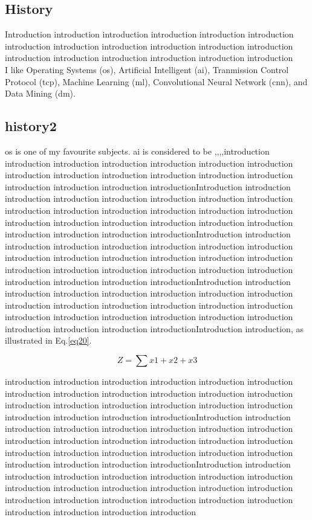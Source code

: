 \subsection{History}
Introduction introduction introduction introduction introduction introduction introduction introduction introduction introduction introduction introduction introduction introduction introduction introduction introduction introduction\\ 
I like Operating Systems (\ac{os}), Artificial Intelligent (\ac{ai}), Tranmission Control Protocol (\ac{tcp}), Machine Learning (\ac{ml}), Convolutional Neural Network (\ac{cnn}), and Data Mining (\ac{dm}). 




\subsection{history2}
\ac{os} is one of my favourite subjects.
\ac{ai} is considered to be ,,,,introduction introduction introduction introduction introduction introduction introduction introduction introduction introduction introduction introduction introduction introduction introduction introduction introductionIntroduction introduction introduction introduction introduction introduction introduction introduction introduction introduction introduction introduction introduction introduction introduction introduction introduction introduction introduction introduction introduction introduction introduction introductionIntroduction introduction introduction introduction introduction introduction introduction introduction introduction introduction introduction introduction introduction introduction introduction introduction introduction introduction introduction introduction introduction introduction introduction introductionIntroduction introduction introduction introduction introduction introduction introduction introduction introduction introduction introduction introduction introduction introduction introduction introduction introduction introduction introduction introduction introduction introduction introduction introductionIntroduction introduction, as illustrated in Eq.\ref{eq20}.

\begin{equation}
Z=\sum x1+x2+x3
\label{eq20}
\end{equation}

introduction introduction introduction introduction introduction introduction introduction introduction introduction introduction introduction introduction introduction introduction introduction introduction introduction introduction introduction introduction introduction introductionIntroduction introduction introduction introduction introduction introduction introduction introduction introduction introduction introduction introduction introduction introduction introduction introduction introduction introduction introduction introduction introduction introduction introduction introductionIntroduction introduction introduction introduction introduction introduction introduction introduction introduction introduction introduction introduction introduction introduction introduction introduction introduction introduction introduction introduction introduction introduction introduction introduction

